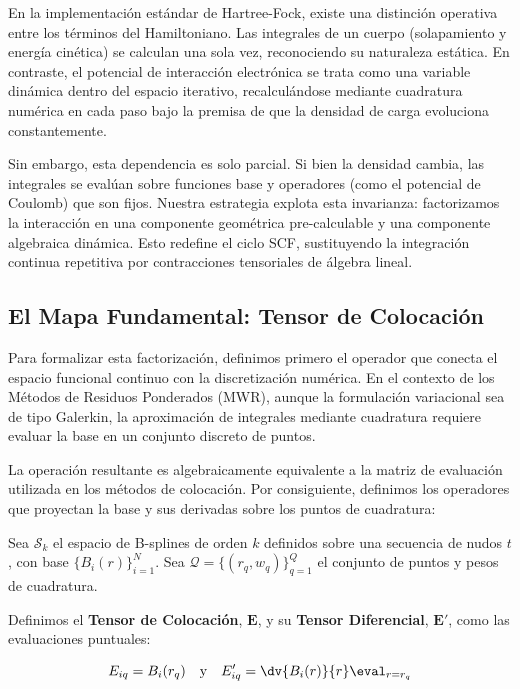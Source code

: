 En la implementación estándar de Hartree-Fock, existe una distinción operativa entre los términos del Hamiltoniano. Las integrales de un cuerpo (solapamiento y energía cinética) se calculan una sola vez, reconociendo su naturaleza estática. En contraste, el potencial de interacción electrónica se trata como una variable dinámica dentro del espacio iterativo, recalculándose mediante cuadratura numérica en cada paso bajo la premisa de que la densidad de carga evoluciona constantemente.

Sin embargo, esta dependencia es solo parcial. Si bien la densidad cambia, las integrales se evalúan sobre funciones base y operadores (como el potencial de Coulomb) que son fijos. Nuestra estrategia explota esta invarianza: factorizamos la interacción en una componente geométrica pre-calculable y una componente algebraica dinámica. Esto redefine el ciclo SCF, sustituyendo la integración continua repetitiva por contracciones tensoriales de álgebra lineal.

\subsection{El Mapa Fundamental: Tensor de Colocación}

Para formalizar esta factorización, definimos primero el operador que conecta el espacio funcional continuo con la discretización numérica. En el contexto de los Métodos de Residuos Ponderados (MWR), aunque la formulación variacional sea de tipo Galerkin, la aproximación de integrales mediante cuadratura requiere evaluar la base en un conjunto discreto de puntos.

La operación resultante es algebraicamente equivalente a la matriz de evaluación utilizada en los métodos de colocación. Por consiguiente, definimos los operadores que proyectan la base y sus derivadas sobre los puntos de cuadratura:

\begin{definition}

  Sea \( \mathcal{S}_k \) el espacio de B-splines de orden \( k \) definidos sobre una secuencia de nudos \( t \), con base \( \{ B_i(r) \}_{i=1}^N \).
  Sea \( \mathcal{Q} = \{ (r_q,w_q) \}_{q=1}^Q \) el conjunto de puntos y pesos de cuadratura.

  Definimos el \textbf{Tensor de Colocación}, \( \bm{E} \), y su \textbf{Tensor Diferencial}, \( \bm{E}' \), como las evaluaciones puntuales:

  \begin{equation}
    \label{eq:collocation-tensor}
    E_{iq} = B_i(r_q) \quad \text{y} \quad E'_{iq} = \dv{B_i(r)}{r} \eval_{r=r_q}
  \end{equation}

\end{definition}

